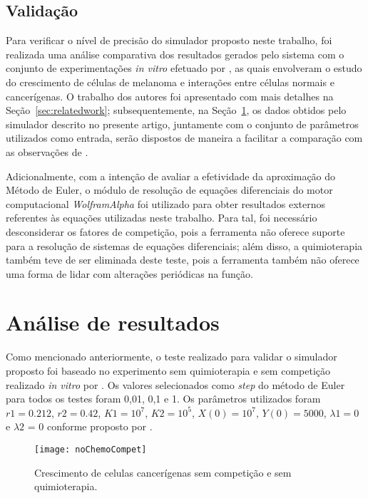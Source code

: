 \documentclass[12pt]{article}
\begin{document}
\subsection{Validação}

Para verificar o nível de precisão do simulador proposto neste trabalho, foi realizada uma análise comparativa dos resultados gerados pelo sistema com o conjunto de experimentações \textit{in vitro} efetuado por \cite{Cornil1991}, as quais envolveram o estudo do crescimento de células de melanoma e interações entre células normais e cancerígenas. O trabalho dos autores foi apresentado com mais detalhes na Seção~\ref{sec:relatedwork}; subsequentemente, na Seção~\ref{sec:results}, os dados obtidos pelo simulador descrito no presente artigo, juntamente com o conjunto de parâmetros utilizados como entrada, serão dispostos de maneira a facilitar a comparação com as observações de \cite{Cornil1991}.

Adicionalmente, com a intenção de avaliar a efetividade da aproximação do Método de Euler, o módulo de resolução de equações diferenciais do motor computacional \emph{WolframAlpha} foi utilizado para obter resultados externos referentes às equações utilizadas neste trabalho. Para tal, foi necessário desconsiderar os fatores de competição, pois a ferramenta não oferece suporte para a resolução de sistemas de equações diferenciais; além disso, a quimioterapia também teve de ser eliminada deste teste, pois a ferramenta também não oferece uma forma de lidar com alterações periódicas na função.

\section{Análise de resultados} \label{sec:results}

Como mencionado anteriormente, o teste realizado para validar o simulador proposto foi baseado no experimento sem quimioterapia e sem competição realizado \textit{in vitro} por \cite{Cornil1991}. Os valores selecionados como \textit{step} do método de Euler para todos os testes foram 0,01, 0,1 e 1.
Os parâmetros utilizados foram $r1 = 0.212$, $r2 = 0.42$, $K1 = 10^7$, $K2 = 10^5$, $X(0) = 10^7$, $Y(0) = 5000$, $\lambda1 = 0$ e $\lambda2$ = 0 conforme proposto por \cite{Cornil1991}.

\begin{figure}[ht]
  \centering
  \texttt{[image: noChemoCompet]}
  \caption{Crescimento de celulas cancerígenas sem competição e sem quimioterapia.}
\end{figure}
\end{document}
